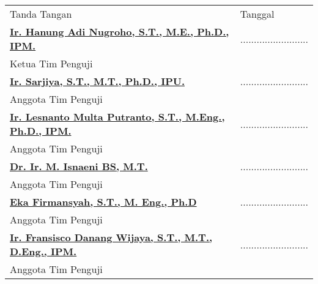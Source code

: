 {
\begin{longtable}{ll}
	\vspace*{1.5cm}
	\hspace*{77pt}Tanda Tangan &\hspace*{24pt}Tanggal\\
	\hspace*{-24pt}\underline{\textbf{Ir. Hanung Adi Nugroho, S.T., M.E., Ph.D., IPM.}}			& \; .........................\\ \vspace*{1.3cm}\hspace*{-24pt}Ketua Tim Penguji &\\
	\hspace*{-24pt}\underline{\textbf{Ir. Sarjiya, S.T., M.T., Ph.D., IPU.}}					& \; .........................\\ \vspace*{1.3cm}\hspace*{-24pt}Anggota Tim Penguji &\\
	\hspace*{-24pt}\underline{\textbf{Ir. Lesnanto Multa Putranto, S.T., M.Eng., Ph.D., IPM.}}	& \; .........................\\ \vspace*{1.3cm}\hspace*{-24pt}Anggota Tim Penguji &\\
	\hspace*{-24pt}\underline{\textbf{Dr. Ir. M. Isnaeni BS, M.T.}}								& \; .........................\\ \vspace*{1.3cm}\hspace*{-24pt}Anggota Tim Penguji &\\
	\hspace*{-24pt}\underline{\textbf{Eka Firmansyah, S.T., M. Eng., Ph.D}}						& \; .........................\\ \vspace*{1.3cm}\hspace*{-24pt}Anggota Tim Penguji &\\
	\hspace*{-24pt}\underline{\textbf{Ir. Fransisco Danang Wijaya, S.T., M.T., D.Eng., IPM.}}	& \; .........................\\ 				\hspace*{-24pt}Anggota Tim Penguji &\\
\end{longtable}
}